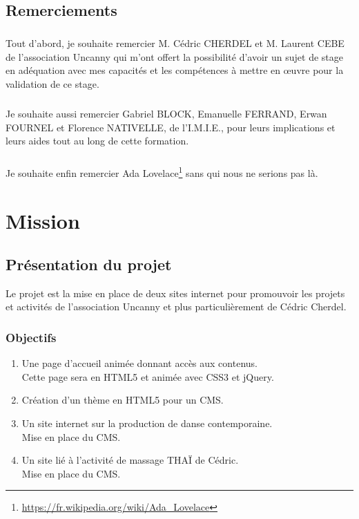 \documentclass[11pt,a4paper]{report}
\begin{document}
	\section{Remerciements}
		\paragraph*{}Tout d'abord, je souhaite  remercier M. Cédric CHERDEL et M. Laurent CEBE de l'association Uncanny qui m'ont offert la possibilité d'avoir un sujet de stage en adéquation avec mes capacités et les compétences à mettre en œuvre pour la validation de ce stage.
		\paragraph*{}Je souhaite aussi remercier Gabriel BLOCK, Emanuelle FERRAND, Erwan FOURNEL et Florence \linebreak NATIVELLE, de l'I.M.I.E., pour leurs implications et leurs aides tout au long de cette formation.
		\paragraph*{}Je souhaite enfin remercier Ada Lovelace\footnote{\url{https://fr.wikipedia.org/wiki/Ada\_Lovelace}} sans qui nous ne serions pas là.

\chapter{Mission}
	\section{Présentation du projet}
		Le projet est la mise en place de deux sites internet pour promouvoir les projets et activités de l'association Uncanny et plus particulièrement de Cédric Cherdel. 
		\subsection{Objectifs}
			\begin{enumerate}
				\item Une page d'accueil animée donnant accès aux contenus.\\
				Cette page sera en HTML5 et animée avec CSS3 et jQuery.
				\item Création d'un thème en HTML5 pour un CMS.
				\item Un site internet sur la production de danse contemporaine.\\
				Mise en place du CMS.
				\item Un site lié à l'activité de massage THAÏ de Cédric.\\
				Mise en place du CMS.
			\end{enumerate}
\end{document}
